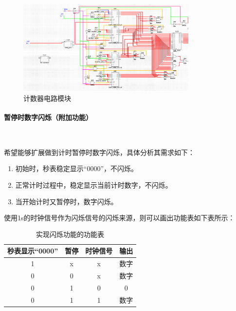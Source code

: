 \documentclass[UTF8]{ctexart}
\numberwithin{figure}{subsection}
\numberwithin{table}{subsection}
\numberwithin{equation}{subsection}
\begin{document}
\begin{figure}[H]
    \begin{center}
        \includegraphics[width=0.8\textwidth]{watch/left half.png}
    \end{center}
    \caption{计数器电路模块}
    \label{watch left}
\end{figure}

\paragraph{暂停时数字闪烁（附加功能）}~
\par 希望能够扩展做到计时暂停时数字闪烁，具体分析其需求如下：
\begin{enumerate}
    \item 初始时，秒表稳定显示“0000”，不闪烁。
    \item 正常计时过程中，稳定显示当前计时数字，不闪烁。
    \item 当开始计时又暂停时，数字闪烁。
\end{enumerate}

\par 使用1s的时钟信号作为闪烁信号的闪烁来源，则可以画出功能表如下表所示：
\begin{table}[h]
    \begin{center}
        \begin{tabular}{c c c|c}
            秒表显示“0000” & 暂停 & 时钟信号 & 输出 \\
            \hline
            1 & x & x & 数字 \\
            0 & 0 & x & 数字 \\
            0 & 1 & 0 & 0 \\
            0 & 1 & 1 & 数字 \\
        \end{tabular}
        \caption{实现闪烁功能的功能表}
    \end{center}
\end{table}
\end{document}
